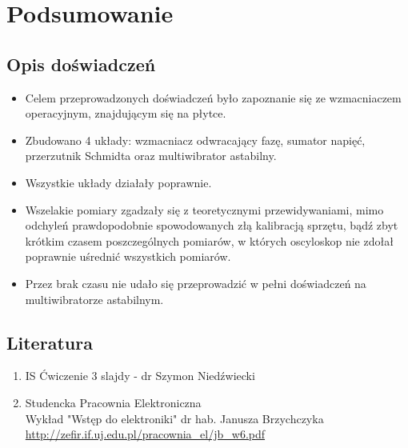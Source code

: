 \chapter{Podsumowanie}

\section{Opis doświadczeń}
\begin{itemize}
    \item Celem przeprowadzonych doświadczeń było zapoznanie się ze wzmacniaczem operacyjnym, znajdującym się na płytce.
    \item Zbudowano 4 układy: wzmacniacz odwracający fazę, sumator napięć, przerzutnik Schmidta oraz multiwibrator astabilny.
    \item Wszystkie układy działały poprawnie. 
    \item Wszelakie pomiary zgadzały się z teoretycznymi przewidywaniami, mimo odchyleń prawdopodobnie spowodowanych złą kalibracją sprzętu, bądź zbyt krótkim czasem poszczególnych pomiarów, w których oscyloskop nie zdołał poprawnie uśrednić wszystkich pomiarów.
    \item Przez brak czasu nie udało się przeprowadzić w pełni doświadczeń na multiwibratorze astabilnym.
\end{itemize}

\section{Literatura}

\begin{enumerate}
    \item IS Ćwiczenie 3 slajdy - dr Szymon Niedźwiecki
    \item Studencka Pracownia Elektroniczna \\
    Wykład "Wstęp do elektroniki" dr hab. Janusza Brzychczyka \\
    \url{http://zefir.if.uj.edu.pl/pracownia_el/jb_w6.pdf}
\end{enumerate}